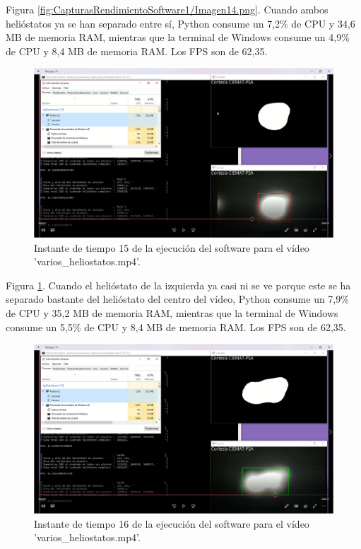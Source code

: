 Figura \ref{fig:CapturasRendimientoSoftware1/Imagen14.png}. Cuando ambos helióstatos ya se han separado entre sí, Python consume un 7,2\% de CPU y 34,6 MB de memoria RAM, mientras que la terminal de Windows consume un 4,9\% de CPU y 8,4 MB de memoria RAM. Los FPS son de 62,35.

\begin{figure}[h!]
  	\centering
	\includegraphics[width=\textwidth]{CapturasRendimientoSoftware1/Imagen15.png}
	\caption{Instante de tiempo 15 de la ejecución del software para el vídeo 'varios\_heliostatos.mp4'.
	\label{fig:CapturasRendimientoSoftware1/Imagen15.png}}
\end{figure}

Figura \ref{fig:CapturasRendimientoSoftware1/Imagen15.png}. Cuando el helióstato de la izquierda ya casi ni se ve porque este se ha separado bastante del helióstato del centro del vídeo, Python consume un 7,9\% de CPU y 35,2 MB de memoria RAM, mientras que la terminal de Windows consume un 5,5\% de CPU y 8,4 MB de memoria RAM. Los FPS son de 62,35.

\begin{figure}[h!]
  	\centering
	\includegraphics[width=\textwidth]{CapturasRendimientoSoftware1/Imagen16.png}
	\caption{Instante de tiempo 16 de la ejecución del software para el vídeo 'varios\_heliostatos.mp4'.
	\label{fig:CapturasRendimientoSoftware1/Imagen16.png}}
\end{figure}

